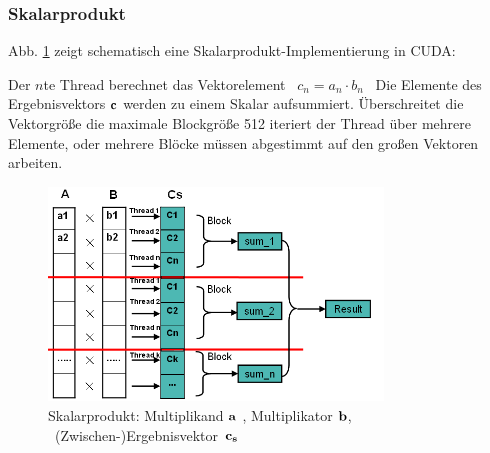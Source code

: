 


\subsubsection{Skalarprodukt}

Abb. \ref{Vektor} zeigt schematisch eine Skalarprodukt-Implementierung in CUDA:

Der $n$te Thread berechnet das Vektorelement \mbox{ $c_n = a_n \cdot b_n$ }
Die Elemente des Ergebnisvektors $ \bf c $ werden  zu einem Skalar
aufsummiert.
Überschreitet die Vektorgröße die maximale Blockgröße 512 iteriert der Thread
über mehrere Elemente, oder mehrere Blöcke müssen
abgestimmt auf den großen Vektoren arbeiten.


\begin{figure}[htbp]
\includegraphics[width=3.5in]{../xby/pic/Vektor}
\caption{ \label{Vektor} Skalarprodukt: Multiplikand $ \bf a$ , Multiplikator $ \bf b$,
\mbox{ (Zwischen-)Ergebnisvektor $\bf c_s$ }}

\end{figure}
